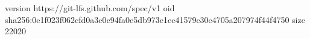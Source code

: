 version https://git-lfs.github.com/spec/v1
oid sha256:0e1f023f062cfd0a3c0c94fa0e5db973e1ec41579c30e4705a207974f44f4750
size 22020
